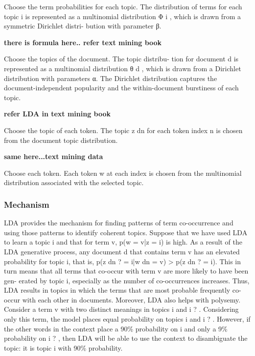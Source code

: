 Choose the term probabilities for each topic. The distribution of terms for each topic i is represented as a multinomial
distribution Φ i , which is drawn from a symmetric Dirichlet distri-
bution with parameter β.

\textbf{there is formula here.. refer text mining book}

Choose the topics of the document. The topic distribu- tion for document d is represented as a multinomial distribution θ d , which is drawn from a Dirichlet distribution with parameters α. The Dirichlet distribution captures the document-independent popularity and the within-document burstiness of each topic.

\textbf{refer LDA in text mining book}

Choose the topic of each token. The topic z dn for each token index n is chosen from the document topic distribution.

\textbf{same here...text mining data}

Choose each token. Each token w at each index is chosen from the multinomial distribution associated with the selected topic.



\subsubsection{Mechanism} LDA provides the mechanism for finding patterns of term co-occurrence and using those patterns to identify coherent topics. Suppose that we have used LDA to learn a topic i and that for term v, p(w = v|z = i) is high. As a result of the LDA generative process, any document d that contains term v has an elevated probability for topic i, that is, p(z dn ? = i|w dn = v) > p(z dn ? = i). This in turn means that all terms that co-occur with term v are more likely to have been gen- erated by topic i, especially as the number of co-occurrences increases. Thus, LDA results in topics in which the terms that are most probable frequently co-occur with each other in documents. Moreover, LDA also helps with polysemy. Consider a term v with two distinct meanings in topics i and i ? . Considering only this term, the model places equal probability on topics i and i ? . However, if the other words in the context place a 90\% probability on i and only a 9\% probability on i ? , then LDA will be able to use the context to disambiguate the topic: it is topic i with 90\% probability.

